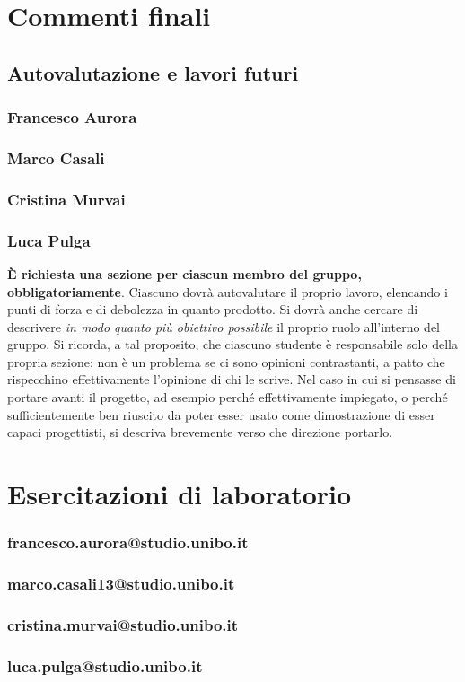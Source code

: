 \documentclass[a4paper,12pt]{report}
\begin{document}
\chapter{Commenti finali}
\section{Autovalutazione e lavori futuri}
\subsection{Francesco Aurora}
\subsection{Marco Casali}
\subsection{Cristina Murvai}
\subsection{Luca Pulga}


\textbf{È richiesta una sezione per ciascun membro del gruppo, obbligatoriamente}.
%
Ciascuno dovrà autovalutare il proprio lavoro, elencando i punti di forza e di debolezza in quanto prodotto.
Si dovrà anche cercare di descrivere \emph{in modo quanto più obiettivo possibile} il proprio ruolo all'interno del gruppo.
Si ricorda, a tal proposito, che ciascuno studente è responsabile solo della propria sezione: non è un problema se ci sono opinioni contrastanti, a patto che rispecchino effettivamente l'opinione di chi le scrive.
Nel caso in cui si pensasse di portare avanti il progetto, ad esempio perché effettivamente impiegato, o perché sufficientemente ben riuscito da poter esser usato come dimostrazione di esser capaci progettisti, si descriva brevemente verso che direzione portarlo.


\chapter{Esercitazioni di laboratorio}

\subsection{francesco.aurora@studio.unibo.it}

\subsection{marco.casali13@studio.unibo.it}

\subsection{cristina.murvai@studio.unibo.it}

\subsection{luca.pulga@studio.unibo.it}
\end{document}
